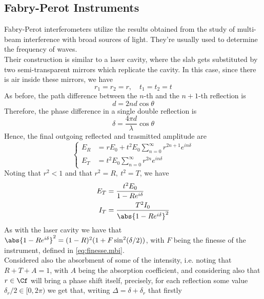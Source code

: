 \documentclass[../electromagnetism.tex]{subfiles}
\begin{document}
\subsection{Fabry-Perot Instruments}
Fabry-Perot interferometers utilize the results obtained from the study of multi-beam interference with broad sources of light. They're usually used to determine the frequency of waves.\\
Their construction is similar to a laser cavity, where the slab gets substituted by two semi-transparent mirrors which replicate the cavity. In this case, since there is air inside these mirrors, we have
\begin{equation*}
	r_1=r_2=r, \quad t_1=t_2=t
\end{equation*}
As before, the path difference between the $n$-th and the $n+1$-th reflection is 
\begin{equation*}
	d=2nd\cos\theta
\end{equation*}
Therefore, the phase difference in a single double reflection is
\begin{equation*}
	\delta=\frac{4\pi d}{\lambda}\cos\theta
\end{equation*}
Hence, the final outgoing reflected and trasmitted amplitude are
\begin{equation}
	\left\{ \begin{aligned}
			E_R&= rE_0+t^2E_0\sum_{n=0}^{\infty}r^{2n+1}e^{in\delta}\\
			E_T&= t^2E_0\sum_{n=0}^{\infty}r^{2n}e^{in\delta}
	\end{aligned}\right.
	\label{eq:eretout.fpi}
\end{equation}
Noting that $r^2<1$ and that $r^2=R, \ t^2=T$, we have
\begin{equation}
	\begin{aligned}
		E_T&= \frac{t^2E_0}{1-Re^{i\delta}}\\
		I_T&= \frac{T^2I_0}{\abs{1-Re^{i\delta}}^2}
	\end{aligned}
	\label{eq:etitout.fpi}
\end{equation}
As with the laser cavity we have that $\abs{1-Re^{i\delta}}^2=(1-R)^2(1+F\sin^2(\delta/2))$, with $F$ being the finesse of the instrument, defined in \eqref{eq:finesse.mbi}.\\
Considered also the absorbment of some of the intensity, i.e. noting that $R+T+A=1$, with $A$ being the absorption coefficient, and considering also that $r\in\Cf$ will bring a phase shift itself, precisely, for each reflection some value $\delta_r/2\in[0, 2\pi)$ we get that, writing $\Delta=\delta+\delta_r$ that firstly
\end{document}
